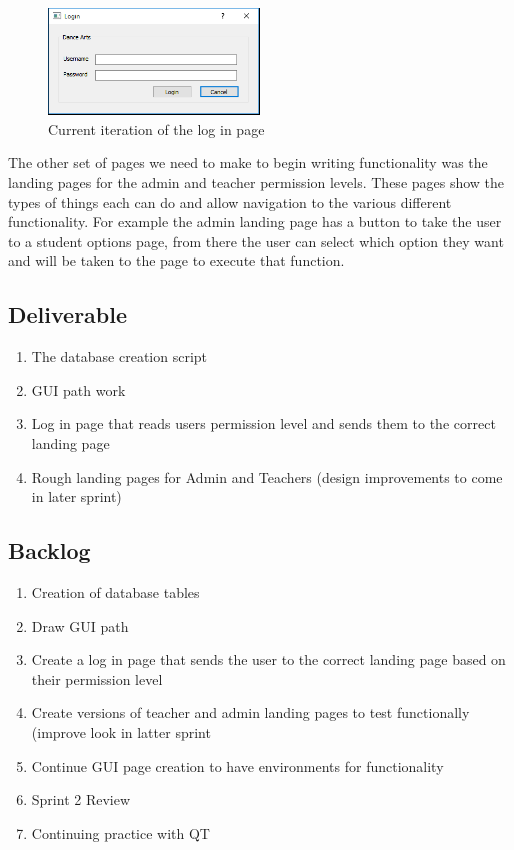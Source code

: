 \begin{figure}
\caption{Current iteration of the log in page}
\centering
\includegraphics[width=0.5\textwidth]{login_page}
\end{figure}

The other set of pages we need to make to begin writing functionality was the landing pages for the admin and teacher permission levels. These pages show the types of things each can do and allow navigation to the various different functionality. For example the admin landing page has a button to take the user to a student options page, from there the user can select which option they want and will be taken to the page to execute that function.\\


\subsection{Deliverable}

\begin{enumerate}
\item The database creation script  
\item GUI path work
\item Log in page that reads users permission level and sends them to the correct landing page
\item Rough landing pages for Admin and Teachers (design improvements to come in later sprint) 
\end{enumerate}

\subsection{Backlog}

\begin{enumerate}
\item Creation of database tables 
\item Draw GUI path
\item Create a log in page that sends the user to the correct landing page based on their permission level
\item Create versions of teacher and admin landing pages to test functionally (improve look in latter sprint 
\item Continue GUI page creation to have environments for functionality 
\item Sprint 2 Review
\item Continuing practice with QT
\end{enumerate}

